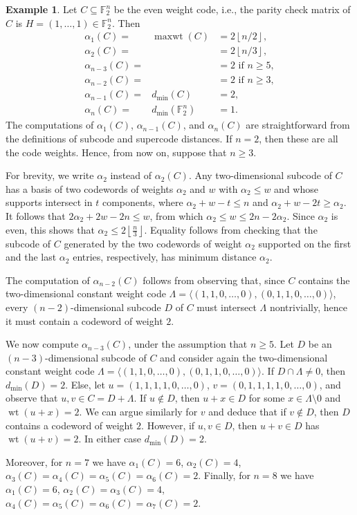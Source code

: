 \documentclass[12pt]{amsart}
\numberwithin{equation}{section}
\DeclareMathOperator{\wt}{wt}
\DeclareMathOperator{\maxwt}{maxwt}
\theoremstyle{definition}
\newtheorem{example}[theorem]{Example}
\newcommand{\FF}{\mathbb{F}}
\begin{document}
\begin{example}
Let $C\subseteq \mathbb{F}_2^n$ be the even weight code, i.e., the parity check matrix of $C$ is $H=(1,\ldots, 1) \in \FF_2^n$. Then
$$\begin{array}{rcl}
\alpha_1(C)=&\maxwt(C)&=2 \displaystyle \left\lfloor n/2\right\rfloor,\\
\alpha_2(C)=&&=2 \displaystyle \left\lfloor n/3 \right\rfloor,\\
\alpha_{n-3}(C)=& &=2 \text{ if } n\geq 5,\\
\alpha_{n-2}(C)=& &=2 \text{ if } n\geq 3,\\
\alpha_{n-1}(C)=&d_{\min}(C)&=2,\\
\alpha_n(C)=&d_{\min}(\FF_2^n)&=1.
\end{array}$$
The computations of $\alpha_1(C)$, $\alpha_{n-1}(C)$, and $\alpha_n(C)$ are straightforward from the definitions of subcode and supercode distances. If $n=2$, then these are all the code weights. Hence, from now on, suppose that $n\geq 3$.

For brevity, we write $\alpha_2$ instead of $\alpha_2(C)$. Any two-dimensional subcode of $C$ has a basis of two codewords of weights $\alpha_2$ and $w$ with $\alpha_2\leq w$ and whose supports intersect in $t$ components, where $\alpha_2+w-t\leq n$ and $\alpha_2+w-2t\geq\alpha_2$. It follows that $2\alpha_2+2w-2n\leq w$, from which $\alpha_2\leq w\leq 2n-2\alpha_2$. Since $\alpha_2$ is even, this shows that $\alpha_2\leq 2\left\lfloor\frac{n}{3}\right\rfloor$. Equality follows from checking that the subcode of $C$ generated by the two codewords of weight $\alpha_2$ supported on the first and the last $\alpha_2$ entries, respectively, has minimum distance $\alpha_2$.

The computation of $\alpha_{n-2}(C)$ follows from observing that, since $C$ contains the two-dimensional constant weight code $\Lambda=\langle (1,1,0,\ldots,0),(0,1,1,0,\ldots,0)\rangle$, every $(n-2)$-dimensional subcode $D$ of $C$ must intersect $\Lambda$ nontrivially, hence it must contain a codeword of weight $2$.

We now compute $\alpha_{n-3}(C)$, under the assumption that $n \geq 5$. Let $D$ be an $(n-3)$-dimensional subcode of $C$ and consider again the two-dimensional constant weight code $\Lambda=\langle (1,1,0,\ldots,0),(0,1,1,0,\ldots,0)\rangle$. If $D\cap\Lambda\neq 0$, then $d_{\min}(D)=2$. Else, let $u=(1,1,1,1,0,\ldots,0)$, $v=(0,1,1,1,1,0,\ldots,0)$, and observe that $u,v\in C=D+\Lambda$. If $u\not\in D$, then $u+x\in D$ for some $x\in \Lambda\setminus 0$ and $\wt(u+x)=2$. We can argue similarly for $v$ and deduce that if $v\not\in D$, then $D$ contains a codeword of weight $2$. However, if $u,v\in D$, then $u+v\in D$ has $\wt(u+v)=2$. In either case $d_{\min}(D)=2$.

\smallskip

Moreover, for $n=7$ we have $\alpha_1(C)=6$, $\alpha_2(C)=4$, $\alpha_3(C)=\alpha_4(C)=\alpha_5(C)=\alpha_6(C)=2$. Finally, for $n=8$ we have $\alpha_1(C)=6$, $\alpha_2(C)=\alpha_3(C)=4$, $\alpha_4(C)=\alpha_5(C)=\alpha_6(C)=\alpha_7(C)=2$.
\end{example}
\end{document}
